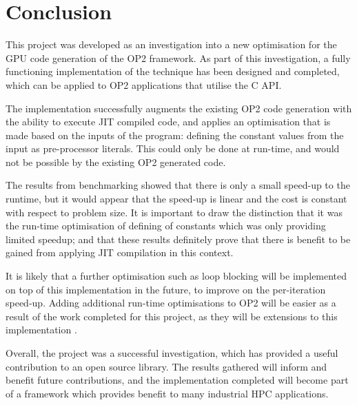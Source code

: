
\section{Conclusion}
\label{s:conc}

This project was developed as an investigation into a new optimisation for the GPU code generation of the OP2 framework. As part of this investigation, a fully functioning implementation of the technique has been designed and completed, which can be applied to OP2 applications that utilise the C API.
\par
The implementation successfully augments the existing OP2 code generation with the ability to execute JIT compiled code, and applies an optimisation that is made based on the inputs of the program: defining the constant values from the input as pre-processor literals. This could only be done at run-time, and would not be possible by the existing OP2 generated code.
\par
The results from benchmarking showed that there is only a small speed-up to the runtime, but it would appear that the speed-up is linear and the cost is constant with respect to problem size. It is important to draw the distinction that it was the run-time optimisation of defining of constants which was only providing limited speedup; and that these results definitely prove that there is benefit to be gained from applying JIT compilation in this context.
\par
It is likely that a further optimisation such as loop blocking will be implemented on top of this implementation in the future, to improve on the per-iteration speed-up. Adding additional run-time optimisations to OP2 will be easier as a result of the work completed for this project, as they will be extensions to this implementation .
\par
Overall, the project was a successful investigation, which has provided a useful contribution to an open source library. The results gathered will inform and benefit future contributions, and the implementation completed will become part of a framework which provides benefit to many industrial HPC applications.
